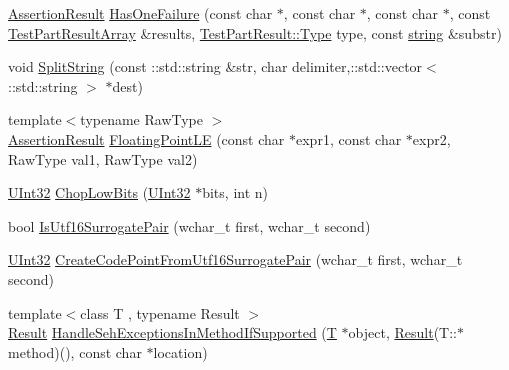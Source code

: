 \begin{DoxyCompactItemize}
\item 
\hyperlink{classtesting_1_1_assertion_result}{Assertion\+Result} \hyperlink{namespacetesting_1_1internal_a14ff02e6d151f45e998657674e9af88a}{Has\+One\+Failure} (const char $\ast$, const char $\ast$, const char $\ast$, const \hyperlink{classtesting_1_1_test_part_result_array}{Test\+Part\+Result\+Array} \&results, \hyperlink{classtesting_1_1_test_part_result_a65ae656b33fdfdfffaf34858778a52d5}{Test\+Part\+Result\+::\+Type} type, const \hyperlink{namespacetesting_1_1internal_a8e8ff5b11e64078831112677156cb111}{string} \&substr)
\item 
void \hyperlink{namespacetesting_1_1internal_aa013dc1d62981cbad93c2fffa0192921}{Split\+String} (const \+::std\+::string \&str, char delimiter,\+::std\+::vector$<$ \+::std\+::string $>$ $\ast$dest)
\item 
{\footnotesize template$<$typename Raw\+Type $>$ }\\\hyperlink{classtesting_1_1_assertion_result}{Assertion\+Result} \hyperlink{namespacetesting_1_1internal_a17b52b6b1f81f6dcad5cc4d12e5173a6}{Floating\+Point\+LE} (const char $\ast$expr1, const char $\ast$expr2, Raw\+Type val1, Raw\+Type val2)
\item 
\hyperlink{namespacetesting_1_1internal_a40d4fffcd2bf56f18b1c380615aa85e3}{U\+Int32} \hyperlink{namespacetesting_1_1internal_a2c54b453387aa8a18f2f3e09f10b5a7d}{Chop\+Low\+Bits} (\hyperlink{namespacetesting_1_1internal_a40d4fffcd2bf56f18b1c380615aa85e3}{U\+Int32} $\ast$bits, int n)
\item 
bool \hyperlink{namespacetesting_1_1internal_a681895f8cc32286211be9889da107394}{Is\+Utf16\+Surrogate\+Pair} (wchar\+\_\+t first, wchar\+\_\+t second)
\item 
\hyperlink{namespacetesting_1_1internal_a40d4fffcd2bf56f18b1c380615aa85e3}{U\+Int32} \hyperlink{namespacetesting_1_1internal_ac8ef1bb10cd9e69de939789b759e6bc9}{Create\+Code\+Point\+From\+Utf16\+Surrogate\+Pair} (wchar\+\_\+t first, wchar\+\_\+t second)
\item 
{\footnotesize template$<$class T , typename Result $>$ }\\\hyperlink{typedefs__d_8js_a28287671eaf7406afd604bd055ba4066}{Result} \hyperlink{namespacetesting_1_1internal_ac5293b438139ef7ed05cb7fcaaf63545}{Handle\+Seh\+Exceptions\+In\+Method\+If\+Supported} (\hyperlink{functions__7_8js_adf1f3edb9115acb0a1e04209b7a9937b}{T} $\ast$object, \hyperlink{typedefs__d_8js_a28287671eaf7406afd604bd055ba4066}{Result}(T\+::$\ast$method)(), const char $\ast$location)
\item 

\end{DoxyCompactItemize}
